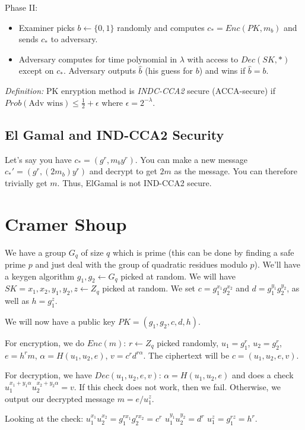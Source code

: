 \documentclass[psamsfonts]{amsart}
\begin{document}
Phase II:
\begin{itemize}
  \item Examiner picks $b \leftarrow \{0,1\}$ randomly and computes $c_* = Enc(PK, m_b)$ and sends $c_*$ to adversary.
  \item Adversary computes for time polynomial in $\lambda$ with access to $Dec(SK,*)$ except on $c_*$. Adversary outputs $\hat{b}$ (his guess for $b$) and wins if $\hat{b} = b$.
\end{itemize}

\emph{Definition:} PK enryption method is \emph{INDC-CCA2} secure (ACCA-secure) if $Prob(\text{Adv wins}) \leq \frac{1}{2} + \epsilon$ where $\epsilon = 2^{-\lambda}$.

\subsection{El Gamal and IND-CCA2 Security}

Let's say you have $c_* = (g^r, m_b y^r)$. You can make a new message $c_*' = (g^r, (2 m_b) y^r)$ and decrypt to get $2m$ as the message. You can therefore trivially get $m$. Thus, ElGamal is not IND-CCA2 secure.

\section{Cramer Shoup}

We have a group $G_q$ of size $q$ which is prime (this can be done by finding a safe prime $p$ and just deal with the group of quadratic residues modulo $p$). We'll have a keygen algorithm $g_1, g_2 \leftarrow G_q$ picked at random. We will have $SK = x_1, x_2, y_1, y_2, z \leftarrow Z_q$ picked at random. We set $c = g_1^{x_1} g_2^{x_2}$ and $d = g_1^{y_1} g_2^{y_2}$, as well as $h = g_1^{z}$.

We will now have a public key $PK = (g_1, g_2, c, d, h)$.

For encryption, we do $Enc(m)$: $r \leftarrow Z_q$ picked randomly, $u_1 = g_1^r$, $u_2 = g_2^r$, $e = h^r m$, $\alpha = H(u_1, u_2, e)$, $v = c^r d^{r \alpha}$. The ciphertext will be $c = (u_1, u_2, e, v)$.

For decryption, we have $Dec(u_1, u_2, e, v)$: $\alpha = H(u_1, u_2, e)$ and does a check $u_1^{x_1 + y_1 \alpha} u_2^{x_2 + y_2 \alpha} = v$. If this check does not work, then we fail. Otherwise, we output our decrypted message $m = e/u_1^z$.

Looking at the check:
$u_1^{x_1} u_2^{x_2} = g_1^{r x_1} g_2^{r x_2} = c^r$
$u_1^{y_1} u_2^{y_2} = d^r$
$u_1^{z} = g_1^{r z} = h^r$.
\end{document}
